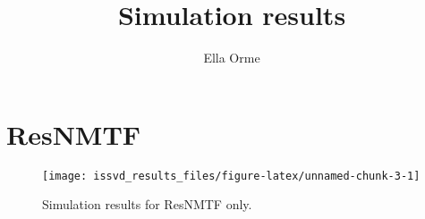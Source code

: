 \documentclass[
]{article}
\title{Simulation results}
\author{Ella Orme}
\date{}
\begin{document}
\maketitle

\hypertarget{resnmtf}{%
\section{ResNMTF}\label{resnmtf}}

\begin{figure}[H]

{\centering \texttt{[image: issvd\_results\_files/figure-latex/unnamed-chunk-3-1]} 

}

\caption{Simulation results for ResNMTF only.}\label{fig:unnamed-chunk-3}
\end{figure}
\end{document}
